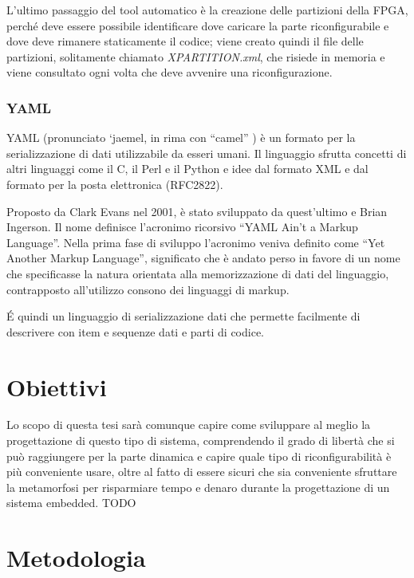 \documentclass[a4paper,titlepage]{book}
\begin{document}
L'ultimo passaggio del tool automatico è la creazione delle partizioni della FPGA, perché deve essere possibile identificare dove caricare la parte riconfigurabile e dove deve rimanere staticamente il codice; viene creato quindi il file delle partizioni, solitamente chiamato \textit{XPARTITION.xml}, che risiede in memoria e viene consultato ogni volta che deve avvenire una riconfigurazione.

\subsection{YAML}
YAML (pronunciato  `jaemel, in rima con ``camel'' ) è un formato per la serializzazione di dati utilizzabile da esseri umani. Il linguaggio sfrutta concetti di altri linguaggi come il C, il Perl e il Python e idee dal formato XML e dal formato per la posta elettronica (RFC2822).

Proposto da Clark Evans nel 2001, è stato sviluppato da quest'ultimo e Brian Ingerson. Il nome definisce l'acronimo ricorsivo ``YAML Ain't a Markup Language''. Nella prima fase di sviluppo l'acronimo veniva definito come ``Yet Another Markup Language'', significato che è andato perso in favore di un nome che specificasse la natura orientata alla memorizzazione di dati del linguaggio, contrapposto all'utilizzo consono dei linguaggi di markup.

\'{E} quindi un linguaggio di serializzazione dati che permette facilmente di descrivere con item e sequenze dati e parti di codice.

\chapter{Obiettivi}
Lo scopo di questa tesi sarà comunque capire come sviluppare al meglio la progettazione di questo tipo di sistema, comprendendo il grado di libertà che si può raggiungere per la parte dinamica e capire quale tipo di riconfigurabilità è più conveniente usare, oltre al fatto di essere sicuri che sia conveniente sfruttare la metamorfosi per risparmiare tempo e denaro durante la progettazione di un sistema embedded.
TODO

\chapter{Metodologia}
\end{document}
